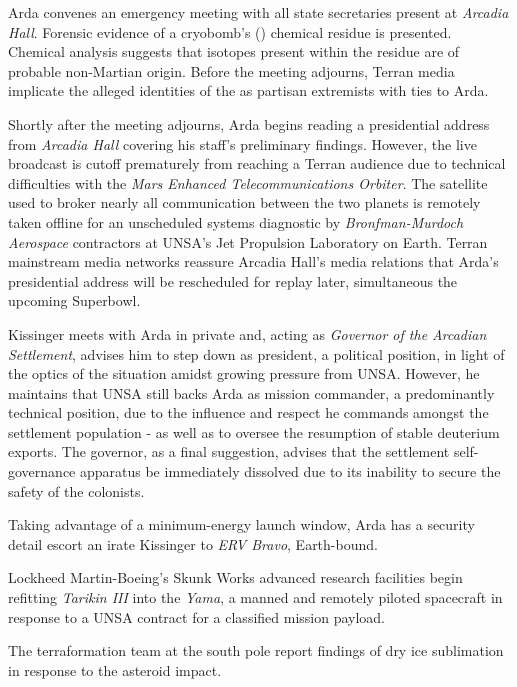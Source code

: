 Arda convenes an emergency meeting with all state secretaries present at {\it Arcadia Hall}. Forensic evidence of a cryobomb's () chemical residue is presented. Chemical analysis suggests that isotopes present within the residue are of probable non-Martian origin. Before the meeting adjourns, Terran media implicate the alleged identities of the  as partisan extremists with ties to Arda. 

Shortly after the meeting adjourns, Arda begins reading a presidential address from {\it Arcadia Hall} covering his staff's preliminary findings. However, the live broadcast is cutoff prematurely from reaching a Terran audience due to technical difficulties with the {\it Mars Enhanced Telecommunications Orbiter}. The satellite used to broker nearly all communication between the two planets is remotely taken offline for an unscheduled systems diagnostic by {\it Bronfman-Murdoch Aerospace} contractors at UNSA's Jet Propulsion Laboratory on Earth. Terran mainstream media networks reassure Arcadia Hall's media relations that Arda's presidential address will be rescheduled for replay later, simultaneous the upcoming Superbowl.

Kissinger meets with Arda in private and, acting as {\it Governor of the Arcadian Settlement}, advises him to step down as president, a political position, in light of the optics of the situation amidst growing pressure from UNSA. However, he maintains that UNSA still backs Arda as mission commander, a predominantly technical position, due to the influence and respect he commands amongst the settlement population - as well as to oversee the resumption of stable deuterium exports. The governor, as a final suggestion, advises that the settlement self-governance apparatus be immediately dissolved due to its inability to secure the safety of the colonists.
\StopTimelineDate

Taking advantage of a minimum-energy launch window, Arda has a security detail escort an irate Kissinger to {\it ERV Bravo}, Earth-bound.
\StopTimelineDate

Lockheed Martin-Boeing's Skunk Works advanced research facilities begin refitting {\it Tarikin III} into the {\it Yama}, a manned and remotely piloted spacecraft in response to a UNSA contract for a classified mission payload.
\StopTimelineDate

The terraformation team at the south pole report findings of dry ice sublimation in response to the asteroid impact.
\StopTimelineDate

